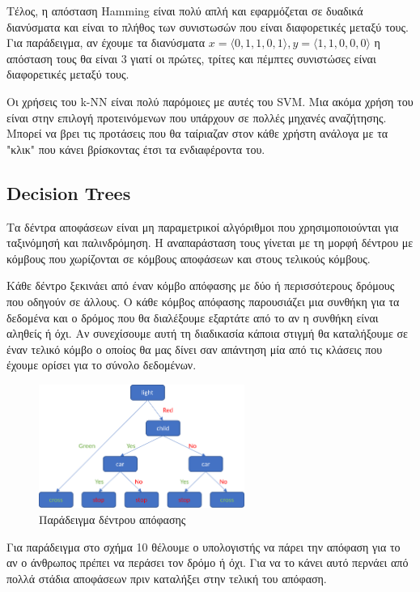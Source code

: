 Τέλος, η απόσταση \textlatin{Hamming} είναι πολύ απλή και εφαρμόζεται σε δυαδικά διανύσματα και
είναι το πλήθος των συνιστωσών που είναι διαφορετικές μεταξύ τους. Για παράδειγμα, αν έχουμε τα
διανύσματα $x=\langle 0,1,1,0,1\rangle,y=\langle 1,1,0,0,0\rangle$ η απόσταση τους θα είναι $3$
γιατί οι πρώτες, τρίτες και πέμπτες συνιστώσες είναι διαφορετικές μεταξύ τους.

Οι χρήσεις του \textlatin{k-NN} είναι πολύ παρόμοιες με αυτές του \textlatin{SVM}. Μια ακόμα χρήση
του είναι στην επιλογή προτεινόμενων που υπάρχουν σε πολλές μηχανές αναζήτησης. Μπορεί να βρει
τις προτάσεις που θα ταίριαζαν στον κάθε χρήστη ανάλογα με τα "κλικ" που κάνει βρίσκοντας έτσι τα
ενδιαφέροντα του.
\subsection{\textlatin{Decision Trees}}
Τα δέντρα αποφάσεων είναι μη παραμετρικοί αλγόριθμοι που χρησιμοποιούνται για ταξινόμησή και
παλινδρόμηση. Η αναπαράσταση τους γίνεται με τη μορφή δέντρου με κόμβους που χωρίζονται σε
κόμβους αποφάσεων και στους τελικούς κόμβους.

Κάθε δέντρο ξεκινάει από έναν κόμβο απόφασης με δύο ή περισσότερους δρόμους που οδηγούν σε άλλους.
Ο κάθε κόμβος απόφασης παρουσιάζει μια συνθήκη για τα δεδομένα και ο δρόμος που θα διαλέξουμε
εξαρτάτε από το αν η συνθήκη είναι αληθείς ή όχι. Αν συνεχίσουμε αυτή τη διαδικασία κάποια στιγμή
θα καταλήξουμε σε έναν τελικό κόμβο ο οποίος θα μας δίνει σαν απάντηση μία από τις κλάσεις που
έχουμε ορίσει για το σύνολο δεδομένων.
\begin{figure}[H]
    \centering
    \includegraphics[width=0.6\textwidth]{images/decisionTree.png}
    \caption{Παράδειγμα δέντρου απόφασης}
\end{figure}
Για παράδειγμα στο σχήμα 10 θέλουμε ο υπολογιστής να πάρει την απόφαση για το αν ο άνθρωπος πρέπει
να περάσει τον δρόμο ή όχι. Για να το κάνει αυτό περνάει από πολλά στάδια αποφάσεων πριν καταλήξει
στην τελική του απόφαση.

